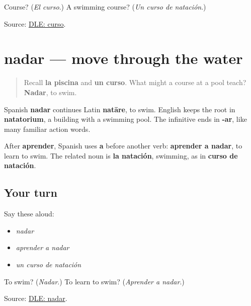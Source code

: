 \begin{tcolorbox}[breakable,colback=teal!4,colframe=teal!35!black,title={Before you move on}]
Course? (\emph{El curso}.) A swimming course? (\emph{Un curso de natación}.)

Source: \href{https://dle.rae.es/curso}{DLE: curso}.
\end{tcolorbox}
\section[nadar]{nadar — move through the water}

\label{lesson:ES-C417-nadar}



\begin{quote}
Recall \textbf{la piscina} and \textbf{un curso}. What might a course at a pool teach? \textbf{Nadar}, to swim.
\end{quote}

\begin{cousinweb}
Spanish \textbf{nadar} continues Latin \textbf{natāre}, to swim. English keeps the root in \textbf{natatorium}, a building with a swimming pool. The infinitive ends in \textbf{-ar}, like many familiar action words.
\end{cousinweb}

\begin{grammarlens}[title={Grammar Lens: learn to swim}]
After \textbf{aprender}, Spanish uses \textbf{a} before another verb: \textbf{aprender a nadar}, to learn to swim. The related noun is \textbf{la natación}, swimming, as in \textbf{curso de natación}.
\end{grammarlens}

\subsection*{Your turn}
Say these aloud:

\begin{itemize}
\raggedright
  \item \emph{nadar}
  \item \emph{aprender a nadar}
  \item \emph{un curso de natación}
\end{itemize}

\begin{tcolorbox}[breakable,colback=teal!4,colframe=teal!35!black,title={Before you move on}]
To swim? (\emph{Nadar}.) To learn to swim? (\emph{Aprender a nadar}.)

Source: \href{https://dle.rae.es/nadar}{DLE: nadar}.
\end{tcolorbox}
